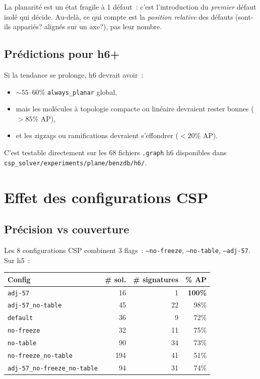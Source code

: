 \documentclass[11pt,a4paper]{article}
\begin{document}
\begin{hypothese}
La planarité est un état \og fragile à 1 défaut\fg{}~: c'est l'introduction du \emph{premier} défaut isolé qui décide. Au-delà, ce qui compte est la \emph{position relative} des défauts (sont-ils appariés? alignés sur un axe?), pas leur nombre.
\end{hypothese}

\subsection{Prédictions pour h6+}

Si la tendance se prolonge, h6 devrait avoir~:
\begin{itemize}[leftmargin=2em,itemsep=0.2em]
  \item ${\sim}55\text{--}60\%$ \texttt{always\_planar} global,
  \item mais les molécules à topologie compacte ou linéaire devraient rester \og bonnes \fg{} ($> 85\%$ AP),
  \item et les zigzags ou ramifications devraient s'effondrer ($< 20\%$ AP).
\end{itemize}
C'est testable directement sur les 68 fichiers \texttt{.graph} h6 disponibles dans \texttt{csp\_solver/experiments/plane/benzdb/h6/}.

\section{Effet des configurations CSP}\label{sec:configs}

\subsection{Précision vs couverture}

Les 8 configurations CSP combinent 3 flags~: \texttt{--no-freeze}, \texttt{--no-table}, \texttt{--adj-57}. Sur h5~:

\begin{center}
\begin{tabular}{@{}lrrr@{}}
\toprule
\textbf{Config} & \textbf{\# sol.} & \textbf{\# signatures} & \textbf{\% AP} \\
\midrule
\texttt{adj-57}                       &  16 &  1 & \textbf{100\%} \\
\texttt{adj-57\_no-table}             &  45 & 22 & 98\%           \\
\texttt{default}                      &  36 &  9 & 72\%           \\
\texttt{no-freeze}                    &  32 & 11 & 75\%           \\
\texttt{no-table}                     &  90 & 34 & 73\%           \\
\texttt{no-freeze\_no-table}          & 194 & 41 & 51\%           \\
\texttt{adj-57\_no-freeze\_no-table}  &  94 & 31 & 74\%           \\
\bottomrule
\end{tabular}
\end{center}
\end{document}
